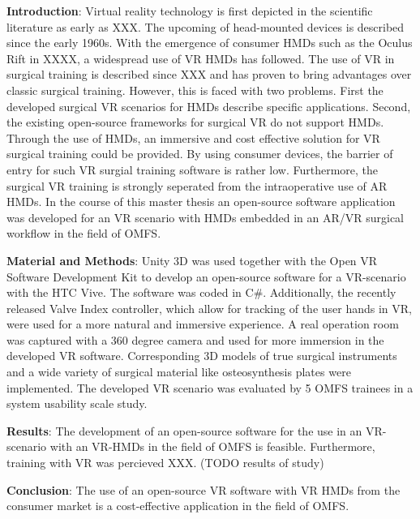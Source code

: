 \textbf{Introduction}: Virtual reality technology is first depicted in the scientific literature as early as XXX.
The upcoming of head-mounted devices is described since the early 1960s.
With the emergence of consumer HMDs such as the Oculus Rift in XXXX, a widespread use of VR HMDs has followed.
The use of VR in surgical training is described since XXX and has proven to bring advantages over classic surgical training.
However, this is faced with two problems.
First the developed surgical VR scenarios for HMDs describe specific applications.
Second, the existing  open-source frameworks for surgical VR do not support HMDs.
Through the use of HMDs, an immersive and cost effective solution for VR surgical training could be provided.
By using consumer devices, the barrier of entry for such VR surgial training software is rather low.
Furthermore, the surgical VR training is strongly seperated from the intraoperative use of AR HMDs.
In the course of this master thesis an open-source software application was developed for an VR scenario with HMDs embedded in an AR/VR surgical workflow in the field of OMFS. 

\textbf{Material and Methods}: Unity 3D was used together with the Open VR Software Development Kit to develop an open-source software for a VR-scenario with the HTC Vive.
The software was coded in C\#. 
Additionally, the recently released Valve Index controller, which allow for tracking of the user hands in VR, were used for a more natural and immersive experience.
A real operation room was captured with a 360 degree camera and used for more immersion in the developed VR software.
Corresponding 3D models of true surgical instruments and a wide variety of surgical material like osteosynthesis plates were implemented.
The developed VR scenario was evaluated by 5 OMFS trainees in a system usability scale study.

\textbf{Results}: The development of an open-source software for the use in an VR-scenario with an VR-HMDs in the field of OMFS is feasible.
Furthermore, training with VR was percieved XXX. (TODO results of study)

\textbf{Conclusion}: The use of an open-source VR software with VR HMDs from the consumer market is a cost-effective application in the field of OMFS.
